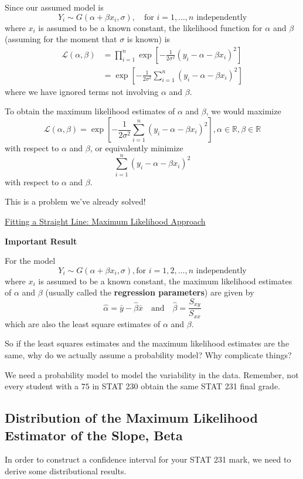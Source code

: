 Since our assumed model is
\[Y_{i} \sim G\left(\alpha+\beta x_{i}, \sigma\right), \quad \text{for } i=1, \ldots, n \text{ independently}\]
where $ x_i $ is assumed to be a known constant, the likelihood function for $ \alpha $
and $ \beta $ (assuming for the moment that $ \sigma $ is known) is
\[\begin{aligned}
        \mathcal{L}(\alpha, \beta)
         & =\prod_{i=1}^{n} \exp \left[-\frac{1}{2 \sigma^{2}}\left(y_{i}-\alpha-\beta x_{i}\right)^{2}\right] \\
         & =\exp \left[-\frac{1}{2 \sigma^{2}} \sum_{i=1}^{n}\left(y_{i}-\alpha-\beta x_{i}\right)^{2}\right]
    \end{aligned}
\]
where we have ignored terms not involving $ \alpha $ and $ \beta $.

To obtain the maximum likelihood estimates of $ \alpha $ and $ \beta $,
we would maximize
\[\mathcal{L}(\alpha, \beta)=\exp \left[-\frac{1}{2 \sigma^{2}} \sum_{i=1}^{n}\left(y_{i}-\alpha-\beta x_{i}\right)^{2}\right],
    \alpha \in \mathbb{R}, \beta \in \mathbb{R}\]
with respect to $ \alpha $ and $ \beta $, or equivalently minimize
\[\sum_{i=1}^{n}\left(y_{i}-\alpha-\beta x_{i}\right)^{2}\]
with respect to $ \alpha $ and $ \beta $.

This is a problem we've already solved!

\underline{Fitting a Straight Line: Maximum Likelihood Approach}

\textbf{Important Result}

For the model
\[Y_{i} \sim G\left(\alpha+\beta x_{i}, \sigma\right),
    \text{for } i=1,2, \ldots, n \text{ independently}\]
where $ x_i $ is assumed to be a known constant, the maximum likelihood estimates of $ \alpha $
and $ \beta $ (usually called the \textbf{regression parameters}) are given by
\[\hat{\alpha}=\bar{y}-\hat{\beta} \bar{x} \quad \text{and} \quad \hat{\beta}=\frac{S_{x y}}{S_{x x}}\]
which are also the least square estimates of $ \alpha $ and $ \beta $.

So if the least squares estimates and the maximum likelihood estimates are the same,
why do we actually assume a probability model? Why complicate things?

We need a probability model to model the variability in the data. Remember,
not every student with a $ 75 $ in STAT 230 obtain the same STAT 231 final grade.

\subsection{Distribution of the Maximum Likelihood Estimator of the Slope, Beta}
In order to construct a confidence interval for your STAT 231 mark, we need to derive
some distributional results.

